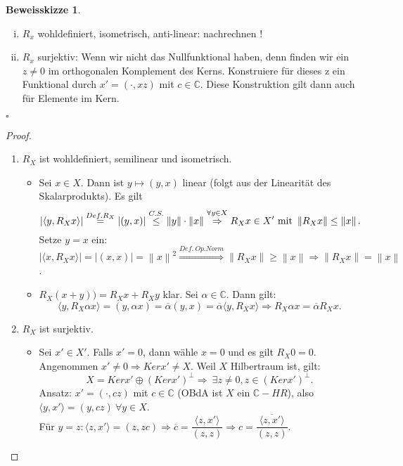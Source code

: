 \documentclass[ngerman]{report}
\theoremstyle{plain}%
\theoremstyle{definition}%
\theoremstyle{myStyle}
\newtheorem*{proof*}{Beweisskizze}
\newenvironment{hinweise}{\footnotesize \begin{proof*}}{\hfill $\square$ \end{proof*}\normalsize}
\newcommand{\C}{\mathbb{C}}
\newcommand{\norm}[1]{\left \|#1\right\| }
\newcommand{\df}[1][]{%
	\overset{#1}{\Rightarrow}
}
\newcommand{\f}[2]{\langle #1,#2 \rangle} %
\begin{document}
	\begin{hinweise}
			\begin{enumerate}[(i)]
				\item $R_x$ wohldefiniert, isometrisch, anti-linear: nachrechnen !
				\item $R_x$ surjektiv: Wenn wir nicht das Nullfunktional haben, denn finden wir ein $z \neq 0$ im orthogonalen Komplement des Kerns. Konstruiere für dieses z ein Funktional durch $x' = (\cdot, x z)$ mit $c \in \C$. Diese Konstruktion gilt dann auch für Elemente im Kern.
			\end{enumerate}
	\end{hinweise}

	\begin{proof}
		\begin{enumerate}[1)]
		\item $R_X$ ist wohldefiniert, semilinear und isometrisch.\\
		\begin{itemize}[]
		\item Sei $x \in X$. Dann ist $y \mapsto (y,x)$ linear (folgt aus der Linearität des Skalarprodukts). Es gilt
		\[
		|\f{y}{R_X x}| \overset{Def. R_X}{=} |(y,x)| \overset{C.S.}{\leq} \norm{y} \cdot \norm{x} \overset{\forall y \in X}{\df} R_X x \in X' \text{ mit } \norm{R_X x}\leq \norm{x}.
		\]
		Setze $y=x$ ein: $|\f{x}{R_X x}| = |(x,x)| = \norm{x}^2 \overset{Def.~Op.Norm}{\Longrightarrow} \norm{R_X x}\geq\norm{x} \df \norm{R_X x}=\norm{x}$.\\
		\item $R_X (x+y) ) = R_X x+ R_X y$ klar. Sei $\alpha \in \C$. Dann gilt:
		\[
		\f{y}{R_X \alpha x}=(y, \alpha x) = \overline{\alpha}(y,x)=\overline{\alpha}\f{y}{R_X x} \df R_X \alpha x = \overline{\alpha} R_X x.
		\]
		\end{itemize}
		\item $R_X$ ist surjektiv.
		\begin{itemize}[]
		\item Sei $ x' \in X'$. Falls $x'=0$, dann wähle $x=0$ und es gilt $R_X 0=0.$ \\
		Angenommen $x' \neq 0 \df Ker x' \neq X.$ Weil $X$ Hilbertraum ist, gilt:
		\[
		X= Ker x' \oplus (Ker x')^{\perp} \df ~\exists z \neq 0, z \in (Ker x')^{\perp}.
		\]
		Ansatz: $x' = (\cdot, cz)$ mit $c \in \C$ (OBdA ist $X$ ein $\C-HR$), also $\f{y}{x'}=(y,cz) ~\forall y \in X$.\\
		Für $y=z: \f{z}{x'}=(z,zc) \df \overline{c}=\dfrac{\f{z}{x'}}{(z,z)} \df c= \dfrac{\overline{\f{z}{x'}}}{(z,z)}$.

\end{itemize}
\end{enumerate}
\end{proof}
\end{document}
